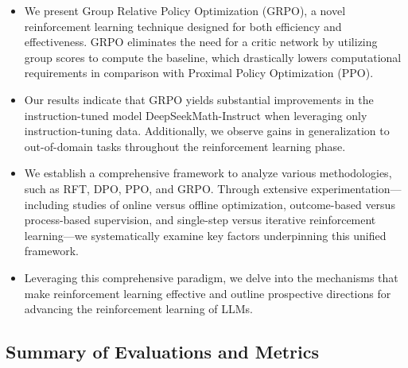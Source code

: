 \begin{itemize}[topsep=0pt]
    \item We present Group Relative Policy Optimization (GRPO), a novel reinforcement learning technique designed for both efficiency and effectiveness. GRPO eliminates the need for a critic network by utilizing group scores to compute the baseline, which drastically lowers computational requirements in comparison with Proximal Policy Optimization (PPO).
    \item Our results indicate that GRPO yields substantial improvements in the instruction-tuned model DeepSeekMath-Instruct when leveraging only instruction-tuning data. Additionally, we observe gains in generalization to out-of-domain tasks throughout the reinforcement learning phase.
    \item We establish a comprehensive framework to analyze various methodologies, such as RFT, DPO, PPO, and GRPO. Through extensive experimentation—including studies of online versus offline optimization, outcome-based versus process-based supervision, and single-step versus iterative reinforcement learning—we systematically examine key factors underpinning this unified framework.
    \item Leveraging this comprehensive paradigm, we delve into the mechanisms that make reinforcement learning effective and outline prospective directions for advancing the reinforcement learning of LLMs.
\end{itemize}

\subsection{Summary of Evaluations and Metrics}

